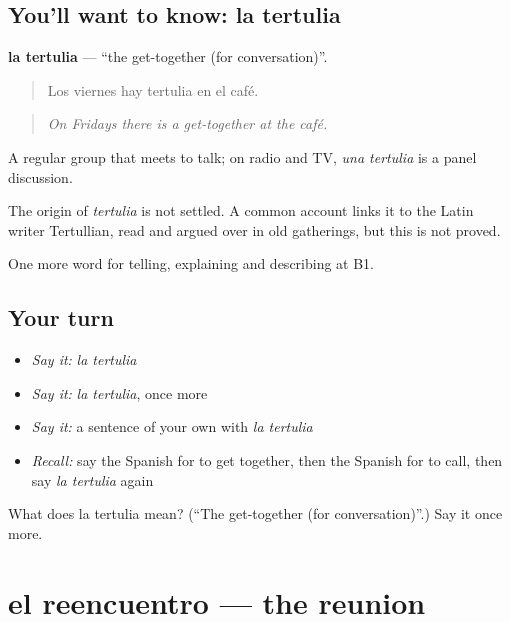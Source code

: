\subsection*{You'll want to know: la tertulia}
\textbf{la tertulia} — \textquotedblleft{}the get-together (for conversation)\textquotedblright{}.

\begin{quote}
Los viernes hay tertulia en el café.
\end{quote}

\begin{quote}
\emph{On Fridays there is a get-together at the café.}
\end{quote}

A regular group that meets to talk; on radio and TV, \emph{una tertulia} is a panel discussion.

\begin{cousinweb}
The origin of \emph{tertulia} is not settled. A common account links it to the Latin writer Tertullian, read and argued over in old gatherings, but this is not proved.
\end{cousinweb}

\begin{grammarlens}[title={What you've built}]
One more word for telling, explaining and describing at B1.
\end{grammarlens}

\subsection*{Your turn}
\begin{itemize}
\raggedright
  \item \emph{Say it:} \emph{la tertulia}
  \item \emph{Say it:} \emph{la tertulia}, once more
  \item \emph{Say it:} a sentence of your own with \emph{la tertulia}
  \item \emph{Recall:} say the Spanish for to get together, then the Spanish for to call, then say \emph{la tertulia} again
\end{itemize}

\begin{tcolorbox}[breakable,colback=teal!4,colframe=teal!35!black,title={Before you move on}]
What does la tertulia mean? (\textquotedblleft{}The get-together (for conversation)\textquotedblright{}.) Say it once more.
\end{tcolorbox}
\section[el reencuentro]{el reencuentro — the reunion}

